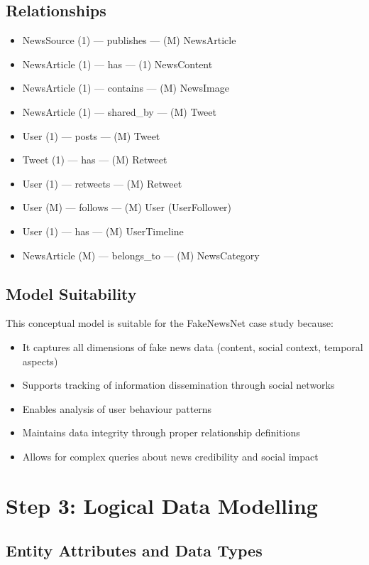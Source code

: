 \documentclass[12pt,a4paper]{report}
\begin{document}
\section{Relationships}

\begin{itemize}
    \item NewsSource (1) --- publishes --- (M) NewsArticle
    \item NewsArticle (1) --- has --- (1) NewsContent
    \item NewsArticle (1) --- contains --- (M) NewsImage
    \item NewsArticle (1) --- shared\_by --- (M) Tweet
    \item User (1) --- posts --- (M) Tweet
    \item Tweet (1) --- has --- (M) Retweet
    \item User (1) --- retweets --- (M) Retweet
    \item User (M) --- follows --- (M) User (UserFollower)
    \item User (1) --- has --- (M) UserTimeline
    \item NewsArticle (M) --- belongs\_to --- (M) NewsCategory
\end{itemize}

\section{Model Suitability}

This conceptual model is suitable for the FakeNewsNet case study because:
\begin{itemize}
    \item It captures all dimensions of fake news data (content, social context, temporal aspects)
    \item Supports tracking of information dissemination through social networks
    \item Enables analysis of user behaviour patterns
    \item Maintains data integrity through proper relationship definitions
    \item Allows for complex queries about news credibility and social impact
\end{itemize}

\chapter{Step 3: Logical Data Modelling}

\section{Entity Attributes and Data Types}
\end{document}
